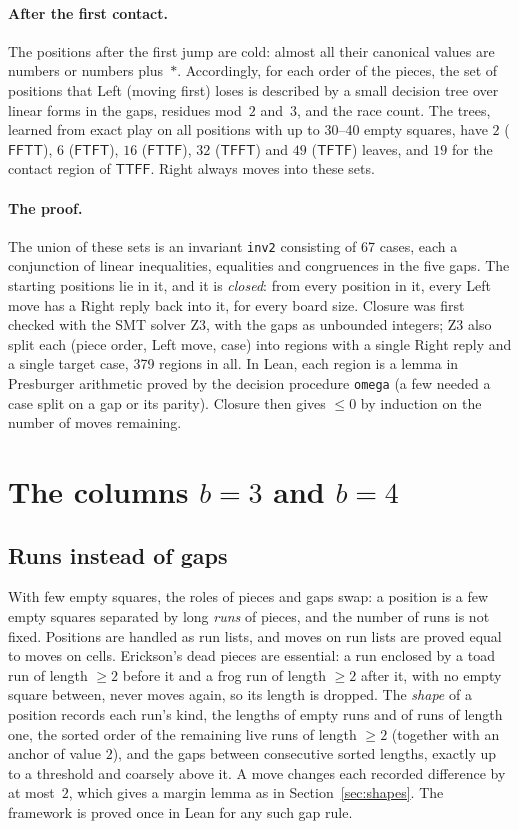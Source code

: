 \documentclass[11pt,a4paper]{article}
\newcommand{\Tt}{\mathsf{T}}
\newcommand{\Ff}{\mathsf{F}}
\newcommand{\lean}[1]{\texttt{#1}}
\theoremstyle{plain}
\theoremstyle{remark}
\begin{document}
\paragraph{After the first contact.} The positions after the first jump are cold: almost all
their canonical values are numbers or numbers plus~$\ast$. Accordingly, for each order of the
pieces, the set of positions that Left (moving first) loses is described by a small decision
tree over linear forms in the gaps, residues mod~$2$ and~$3$, and the race count. The trees,
learned from exact play on all positions with up to 30--40 empty squares, have
$2$ ($\Ff\Ff\Tt\Tt$), $6$ ($\Ff\Tt\Ff\Tt$), $16$ ($\Ff\Tt\Tt\Ff$), $32$ ($\Tt\Ff\Ff\Tt$) and $49$
($\Tt\Ff\Tt\Ff$) leaves, and $19$ for the contact region of $\Tt\Tt\Ff\Ff$. Right always moves
into these sets.

\paragraph{The proof.} The union of these sets is an invariant \lean{inv2} consisting of 67 cases,
each a conjunction of linear inequalities, equalities and congruences in the five gaps. The
starting positions lie in it, and it is \emph{closed}: from every position in it, every Left move
has a Right reply back into it, for every board size. Closure was first checked with the SMT
solver Z3, with the gaps as unbounded integers; Z3 also split each (piece order, Left move, case)
into regions with a single Right reply and a single target case, 379 regions in all. In Lean,
each region is a lemma in Presburger arithmetic proved by the decision procedure \lean{omega}
(a few needed a case split on a gap or its parity). Closure then gives $\le 0$ by induction on
the number of moves remaining.

\section{The columns \texorpdfstring{$b=3$}{b=3} and \texorpdfstring{$b=4$}{b=4}}

\subsection{Runs instead of gaps}

With few empty squares, the roles of pieces and gaps swap: a position is a few empty squares
separated by long \emph{runs} of pieces, and the number of runs is not fixed. Positions are
handled as run lists, and moves on run lists are proved equal to moves on cells. Erickson's dead
pieces are essential: a run enclosed by a toad run of length $\ge2$ before it and a frog run of
length $\ge2$ after it, with no empty square between, never moves again, so its length is
dropped. The \emph{shape} of a position records each run's kind, the lengths of empty runs and of
runs of length one, the sorted order of the remaining live runs of length $\ge2$ (together with an
anchor of value $2$), and the gaps between consecutive sorted lengths, exactly up to a threshold
and coarsely above it. A move changes each recorded difference by at most~$2$, which gives a margin
lemma as in Section~\ref{sec:shapes}. The framework is proved once in Lean for any such gap rule.
\end{document}
